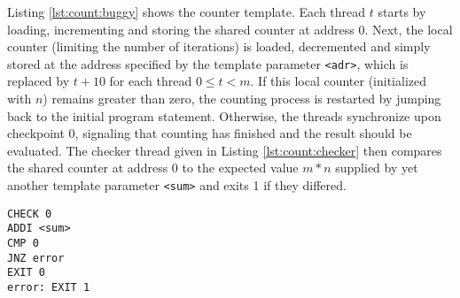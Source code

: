 \vspace{-.1\baselineskip}

Listing \ref{lst:count:buggy} shows the  counter template. %
Each thread $t$ starts by loading, incrementing and storing the shared counter at address 0.
Next, the local counter (limiting the number of iterations) is loaded, decremented and simply stored at the address specified by the template parameter \texttt{<adr>}, which is replaced by $t + 10$ for each thread $0 \leq t < m$.
If this local counter (initialized with $n$) remains greater than zero, the counting process is restarted by jumping back to the initial program statement.
Otherwise, the threads synchronize upon checkpoint 0, signaling that counting has finished and the result should be evaluated.
The checker thread given in Listing \ref{lst:count:checker} then compares the shared counter at address 0 to the expected value $m * n$ supplied by yet another template parameter \texttt{<sum>} and exits 1 if they differed.
\begin{lstlisting}[style=asm, caption={Checker Template}, label={lst:count:checker}, mathescape, xleftmargin=0.39\textwidth]
CHECK 0
ADDI <sum>
CMP 0
JNZ error
EXIT 0
error: EXIT 1
\end{lstlisting}

